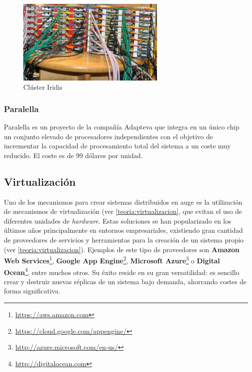 \begin{figure}[H]
	\centering
	\includegraphics[width=0.65\textwidth]{Chapters/Chapter1/Figures/iridis-pi.jpg}
	\caption[Iridis]{Clúster Iridis}
	\label{cox:iridis}
\end{figure}

\subsubsection{Paralella}

Paralella es un proyecto de la compañía Adapteva que integra en un único chip un conjunto elevado de procesadores independientes con el objetivo de incrementar la capacidad de procesamiento total del sistema a un coste muy reducido\cite{paralella}. El coste es de 99 dólares por unidad.

\subsection{Virtualización}

Uno de los mecanismos para crear sistemas distribuidos en auge es la utilización de mecanismos de virtualización (ver \ref{teoria:virtualizacion}, que evitan el uso de diferentes unidades de \textit{hardware}. Estas soluciones se han popularizado en los últimos años principalmente en entornos empresariales, existiendo gran cantidad de proveedores de servicios y herramientas para la creación de un sistema propio (ver \ref{teoria:virtualizacion}). Ejemplos de este tipo de proveedores son \textbf{Amazon Web Services}\footnote{\href{http://aws.amazon.com/}{https://aws.amazon.com}}, \textbf{Google App Engine}\footnote{\href{https://cloud.google.com/appengine/}{https://cloud.google.com/appengine/}}, \textbf{Microsoft Azure}\footnote{\href{http://azure.microsoft.com/}{http://azure.microsoft.com/en-us/}} o \textbf{Digital Ocean}\footnote{\href{http://digitalocean.com}{http://digitalocean.com}}, entre muchos otros. Su éxito reside en su gran versatilidad: es sencillo crear y destruir nuevas réplicas de un sistema bajo demanda, ahorrando costes de forma significativa.

